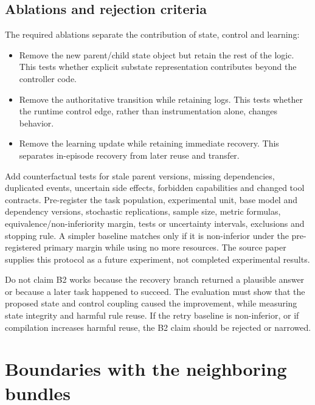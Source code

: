 \subsection{Ablations and rejection criteria}

The required ablations separate the contribution of state, control and learning:

\begin{itemize}
  \item Remove the new parent/child state object but retain the rest of the logic. This tests whether explicit substate representation contributes beyond the controller code.
  \item Remove the authoritative transition while retaining logs. This tests whether the runtime control edge, rather than instrumentation alone, changes behavior.
  \item Remove the learning update while retaining immediate recovery. This separates in-episode recovery from later reuse and transfer.
\end{itemize}

Add counterfactual tests for stale parent versions, missing dependencies, duplicated events, uncertain side effects, forbidden capabilities and changed tool contracts. Pre-register the task population, experimental unit, base model and dependency versions, stochastic replications, sample size, metric formulas, equivalence/non-inferiority margin, tests or uncertainty intervals, exclusions and stopping rule. A simpler baseline matches only if it is non-inferior under the pre-registered primary margin while using no more resources. The source paper supplies this protocol as a future experiment, not completed experimental results.

\begin{warningbox}
Do not claim B2 works because the recovery branch returned a plausible answer or because a later task happened to succeed. The evaluation must show that the proposed state and control coupling caused the improvement, while measuring state integrity and harmful rule reuse. If the retry baseline is non-inferior, or if compilation increases harmful reuse, the B2 claim should be rejected or narrowed.
\end{warningbox}

\section{Boundaries with the neighboring bundles}
\label{sec:ch13-boundaries}

